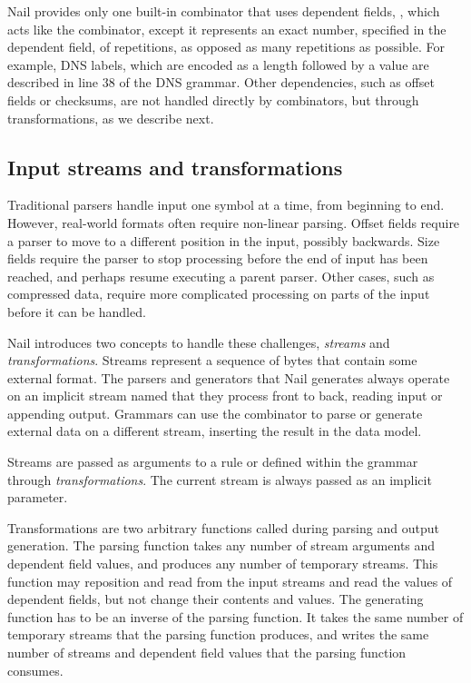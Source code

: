 Nail provides only one built-in combinator that uses dependent fields, , which acts like
the  combinator, except it represents an exact number, specified in the dependent field, of
repetitions, as opposed as many repetitions as possible. For example, DNS labels, which
are encoded as a length followed by
a value are described in line 38 of the DNS grammar.
Other dependencies, such as offset fields or checksums, are not handled directly by combinators, but
through  transformations, as we describe next.

\subsection{Input streams and transformations}
\label{s:transforms}

Traditional parsers handle input one symbol at a time, from beginning to end.
However, real-world formats often require non-linear parsing. Offset fields require a parser to move
to a different position in the input, possibly backwards. Size fields require the parser to stop
processing before the end of input has been reached, and perhaps resume executing a parent parser.
Other cases, such as compressed data, require more complicated processing on parts of the input
before it can be handled.

Nail introduces two concepts to handle these challenges, \emph{streams} and \emph{transformations}. 
Streams represent a sequence of bytes that contain some external format. The parsers and generators
that Nail generates always operate on an implicit stream named  that they process front to
back, reading input or appending output.
Grammars can use the  combinator to parse or generate external data on a different stream,
inserting the result in the data model.

Streams are passed as arguments to a rule or defined within the grammar through \emph{transformations}.
The current stream is always passed as an implicit parameter.

Transformations are two arbitrary functions called during parsing and output generation.
The parsing function  takes any number of stream arguments and dependent field values,
and produces any number of temporary streams. This function may reposition and read from the
input streams and read the values of dependent fields, but not change their contents and values. 
The generating function has to be an inverse of the parsing function. It takes the same number of
temporary streams that the parsing function produces, and writes the same number of streams and
dependent field values that the parsing function consumes.

